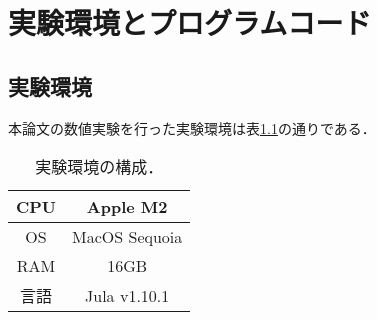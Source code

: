 \chapter{実験環境とプログラムコード}
\label{chap:実験環境とプログラムコード}
\section{実験環境}
本論文の数値実験を行った実験環境は表\ref{tab:machine_spec}の通りである．
\begin{table}[H]
    \centering
    \caption{実験環境の構成．}
    \begin{tabular}{|c||c|}
        \hline
        CPU & Apple M2\\
        \hline
        OS & MacOS Sequoia\\
        \hline
        RAM & 16GB\\
        \hline
        言語 & Jula v1.10.1\\
        \hline
    \end{tabular}
    \label{tab:machine_spec}
\end{table}



